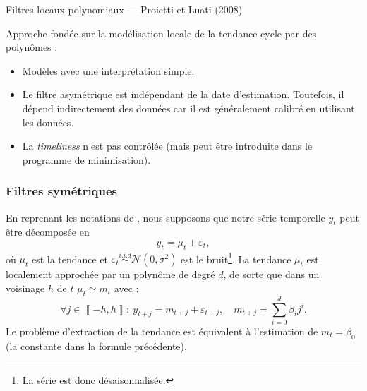 \documentclass[
  12pt,
  a4paper,french]{article}
\newcommand\1{\mathds{1}}
\begin{document}
\begin{summary_box}{Filtres locaux polynomiaux --- Proietti et Luati (2008)}

Approche fondée sur la modélisation locale de la tendance-cycle par des polynômes :

\begin{itemize}
\item
  Modèles avec une interprétation simple.
\item
  Le filtre asymétrique est indépendant de la date d'estimation.
  Toutefois, il dépend indirectement des données car il est généralement calibré en utilisant les données.
\item
  La \emph{timeliness} n'est pas contrôlée (mais peut être introduite dans le programme de minimisation).
\end{itemize}

\end{summary_box}

\hypertarget{filtres-symuxe9triques}{%
\subsubsection{Filtres symétriques}\label{filtres-symuxe9triques}}

En reprenant les notations de \textcite{proietti2008}, nous supposons que notre série temporelle \(y_t\) peut être décomposée en
\[
y_t=\mu_t+\varepsilon_t,
\]
où \(\mu_t\) est la tendance et \(\varepsilon_{t}\overset{i.i.d}{\sim}\mathcal{N}(0,\sigma^{2})\) est le bruit\footnote{La série est donc désaisonnalisée.}.
La tendance \(\mu_t\) est localement approchée par un polynôme de degré \(d\), de sorte que dans un voisinage \(h\) de \(t\) \(\mu_t\simeq m_{t}\) avec :
\[
\forall j\in\left\llbracket -h,h\right\rrbracket :\:
y_{t+j}=m_{t+j}+\varepsilon_{t+j},\quad m_{t+j}=\sum_{i=0}^{d}\beta_{i}j^{i}.
\]
Le problème d'extraction de la tendance est équivalent à l'estimation de \(m_t=\beta_0\) (la constante dans la formule précédente).
\end{document}
